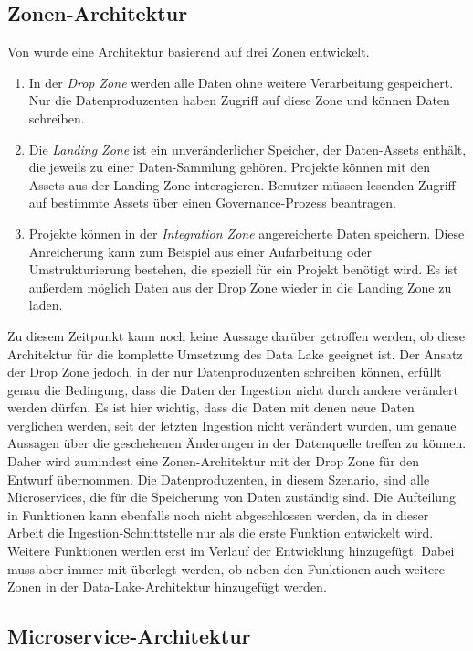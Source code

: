 \subsection{Zonen-Architektur}
Von \textcite{ingestion_02} wurde eine Architektur basierend auf drei Zonen entwickelt.
\begin{enumerate}
    \item In der \emph{Drop Zone} werden alle Daten ohne weitere Verarbeitung gespeichert.
          Nur die Datenproduzenten haben Zugriff auf diese Zone und können Daten schreiben.
    \item Die \emph{Landing Zone} ist ein unveränderlicher Speicher, der Daten-Assets enthält, die jeweils zu einer Daten-Sammlung gehören. Projekte können mit den Assets aus der Landing Zone interagieren.
          Benutzer müssen lesenden Zugriff auf bestimmte Assets über einen Governance-Prozess beantragen.
    \item Projekte können in der \emph{Integration Zone} angereicherte Daten speichern.
          Diese Anreicherung kann zum Beispiel aus einer Aufarbeitung oder Umstrukturierung bestehen, die speziell für ein Projekt benötigt wird.
          Es ist außerdem möglich Daten aus der Drop Zone wieder in die Landing Zone zu laden.
\end{enumerate}
Zu diesem Zeitpunkt kann noch keine Aussage darüber getroffen werden, ob diese Architektur für die komplette Umsetzung des Data Lake geeignet ist.
Der Ansatz der Drop Zone jedoch, in der nur Datenproduzenten schreiben können, erfüllt genau die Bedingung, dass die Daten der Ingestion nicht durch andere verändert werden dürfen.
Es ist hier wichtig, dass die Daten mit denen neue Daten verglichen werden, seit der letzten Ingestion nicht verändert wurden, um genaue Aussagen über die geschehenen Änderungen in der Datenquelle treffen zu können.
Daher wird zumindest eine Zonen-Architektur mit der Drop Zone für den Entwurf übernommen.
Die Datenproduzenten, in diesem Szenario, sind alle Microservices, die für die Speicherung von Daten zuständig sind.
Die Aufteilung in Funktionen kann ebenfalls noch nicht abgeschlossen werden, da in dieser Arbeit die Ingestion-Schnittstelle nur als die erste Funktion entwickelt wird.
Weitere Funktionen werden erst im Verlauf der Entwicklung hinzugefügt.
Dabei muss aber immer mit überlegt werden, ob neben den Funktionen auch weitere Zonen in der Data-Lake-Architektur hinzugefügt werden.

\subsection{Microservice-Architektur}
\label{sec:arch}

